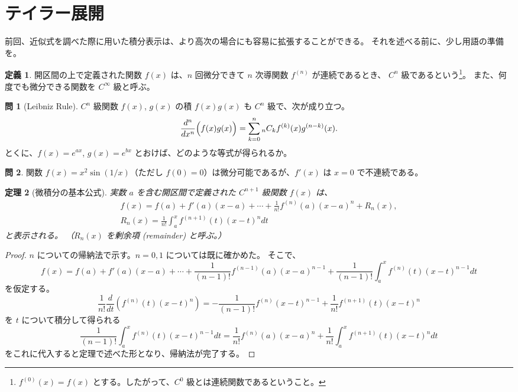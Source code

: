 \documentclass[a4paper]{jsarticle}
\newtheorem{Theorem}{定理}[section]
\theoremstyle{definition}
\newtheorem{Definition}[Theorem]{定義}
\newtheorem{Exercise}{問}%
\theoremstyle{remark}
\begin{document}
\bigskip
\section{テイラー展開}

前回、近似式を調べた際に用いた積分表示は、より高次の場合にも容易に拡張することができる。
それを述べる前に、少し用語の準備を。

\begin{Definition}
開区間の上で定義された関数 $f(x)$ は、$n$ 回微分できて $n$ 次導関数 $f^{(n)}$ が連続であるとき、
$C^n$ 級であるという\footnote{$f^{(0)}(x) = f(x)$ とする。したがって、$C^0$ 級とは連続関数であるということ。}。
また、何度でも微分できる関数を $C^\infty$ 級と呼ぶ。
\end{Definition}

\begin{Exercise}[Leibniz Rule]
$C^n$ 級関数 $f(x)$, $g(x)$ の積 $f(x)g(x)$ も $C^n$ 級で、次が成り立つ。
\[
\frac{d^n}{dx^n}\Bigl( f(x)g(x) \Bigr) = \sum_{k=0}^n {}_nC_k f^{(k)}(x) g^{(n-k)}(x). 
\]
とくに、$f(x) = e^{ax}$, $g(x) = e^{bx}$ とおけば、どのような等式が得られるか。
\end{Exercise}

\begin{Exercise}
関数 $f(x) = x^2 \sin(1/x)$（ただし $f(0) = 0$）は微分可能であるが、$f'(x)$ は $x=0$ で不連続である。
\end{Exercise}

\begin{Theorem}[微積分の基本公式]%
実数 $a$ を含む開区間で定義された $C^{n+1}$ 級関数 $f(x)$ は、
\begin{gather*}
f(x) = f(a) + f'(a)(x-a) + \cdots + \frac{1}{n!} f^{(n)}(a)(x-a)^{n}
+ R_n(x),\\ 
R_n(x) = \frac{1}{n!} \int_a^x f^{(n+1)}(t)(x-t)^{n} dt
\end{gather*}
と表示される。
（$R_n(x)$ を剰余項 (remainder) と呼ぶ。）
\end{Theorem}

\begin{proof}
$n$ についての帰納法で示す。$n=0,1$ については既に確かめた。
そこで、
\[
f(x) = f(a) + f'(a)(x-a) + \cdots + \frac{1}{(n-1)!}
f^{(n-1)}(a)(x-a)^{n-1}
+ \frac{1}{(n-1)!} \int_a^x f^{(n)}(t)(x-t)^{n-1} dt
\]
を仮定する。
\[
\frac{1}{n!} \frac{d}{dt} \left( f^{(n)}(t)(x-t)^n \right)
= - \frac{1}{(n-1)!}f^{(n)}(x-t)^{n-1} + \frac{1}{n!} f^{(n+1)}(t)
(x-t)^n
\]
を $t$ について積分して得られる
\[
\frac{1}{(n-1)!}\int_a^x f^{(n)}(t)(x-t)^{n-1} dt =
\frac{1}{n!} f^{(n)}(a)(x-a)^n + \frac{1}{n!} 
\int_a^x f^{(n+1)}(t)(x-t)^n dt
\]
をこれに代入すると定理で述べた形となり、帰納法が完了する。
\end{proof}
\end{document}
